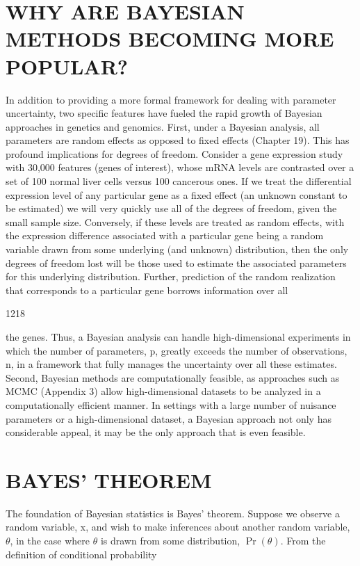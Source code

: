 \documentclass{article}
\begin{document}
\section{WHY ARE BAYESIAN METHODS BECOMING MORE POPULAR?}
In addition to providing a more formal framework for dealing with parameter uncertainty, two specific features have fueled the rapid growth of Bayesian approaches in genetics and genomics. First, under a Bayesian analysis, all parameters are random effects as opposed to fixed effects (Chapter 19). This has profound implications for degrees of freedom. Consider a gene expression study with 30,000 features (genes of interest), whose mRNA levels are contrasted over a set of 100 normal liver cells versus 100 cancerous ones. If we treat the differential expression level of any particular gene as a fixed effect (an unknown constant to be estimated) we will very quickly use all of the degrees of freedom, given the small sample size. Conversely, if these levels are treated as random effects, with the expression difference associated with a particular gene being a random variable drawn from some underlying (and unknown) distribution, then the only degrees of freedom lost will be those used to estimate the associated parameters for this underlying distribution. Further, prediction of the random realization that corresponds to a particular gene borrows information over all

1218

the genes. Thus, a Bayesian analysis can handle high-dimensional experiments in which the number of parameters, p, greatly exceeds the number of observations, n, in a framework that fully manages the uncertainty over all these estimates. Second, Bayesian methods are computationally feasible, as approaches such as MCMC (Appendix 3) allow high-dimensional datasets to be analyzed in a computationally efficient manner. In settings with a large number of nuisance parameters or a high-dimensional dataset, a Bayesian approach not only has considerable appeal, it may be the only approach that is even feasible.

\section{BAYES' THEOREM}
The foundation of Bayesian statistics is Bayes' theorem. Suppose we observe a random variable, x, and wish to make inferences about another random variable,  $ \theta $, in the case where  $ \theta $ is drawn from some distribution,  $ \operatorname{Pr}(\theta) $. From the definition of conditional probability
\end{document}
